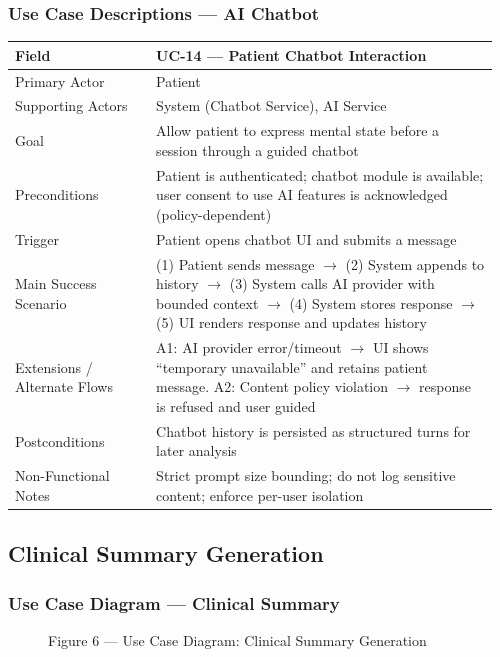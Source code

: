 \documentclass[12pt]{article}
\begin{document}
\subsubsection*{Use Case Descriptions --- AI Chatbot}
\begin{longtable}{L{0.28\linewidth} L{0.68\linewidth}}
\toprule
\textbf{Field} & \textbf{UC-14 --- Patient Chatbot Interaction} \\
\midrule
\endhead
Primary Actor & Patient \\
Supporting Actors & System (Chatbot Service), AI Service \\
Goal & Allow patient to express mental state before a session through a guided chatbot \\
Preconditions & Patient is authenticated; chatbot module is available; user consent to use AI features is acknowledged (policy-dependent) \\
Trigger & Patient opens chatbot UI and submits a message \\
Main Success Scenario & (1) Patient sends message $\rightarrow$ (2) System appends to history $\rightarrow$ (3) System calls AI provider with bounded context $\rightarrow$ (4) System stores response $\rightarrow$ (5) UI renders response and updates history \\
Extensions / Alternate Flows & A1: AI provider error/timeout $\rightarrow$ UI shows ``temporary unavailable'' and retains patient message. A2: Content policy violation $\rightarrow$ response is refused and user guided \\
Postconditions & Chatbot history is persisted as structured turns for later analysis \\
Non-Functional Notes & Strict prompt size bounding; do not log sensitive content; enforce per-user isolation \\
\bottomrule
\end{longtable}

\subsection{Clinical Summary Generation}
\subsubsection*{Use Case Diagram --- Clinical Summary}
\begin{figure}[h]
  \centering
  \caption{Figure 6 --- Use Case Diagram: Clinical Summary Generation}
\end{figure}
\end{document}
